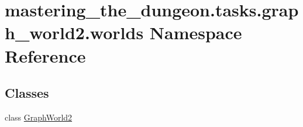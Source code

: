 \hypertarget{namespacemastering__the__dungeon_1_1tasks_1_1graph__world2_1_1worlds}{}\section{mastering\+\_\+the\+\_\+dungeon.\+tasks.\+graph\+\_\+world2.\+worlds Namespace Reference}
\label{namespacemastering__the__dungeon_1_1tasks_1_1graph__world2_1_1worlds}
\subsection*{Classes}
\begin{DoxyCompactItemize}
\item 
class \hyperlink{classmastering__the__dungeon_1_1tasks_1_1graph__world2_1_1worlds_1_1GraphWorld2}{Graph\+World2}
\end{DoxyCompactItemize}
